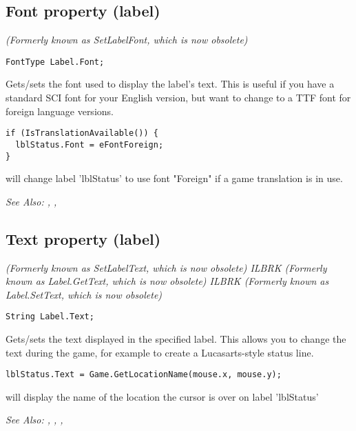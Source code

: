 \subsection{Font property (label)}\label{Label.Font}%

\it{(Formerly known as SetLabelFont, which is now obsolete)}

\begin{verbatim}
FontType Label.Font;
\end{verbatim}
Gets/sets the font used to display the label's text. This is useful if you
have a standard SCI font for your English version, but want to change to
a TTF font for foreign language versions.

\begin{verbatim}
if (IsTranslationAvailable()) {
  lblStatus.Font = eFontForeign;
}
\end{verbatim}

will change label 'lblStatus' to use font "Foreign" if a game translation is in use.

\it{See Also:} ,
, 


\subsection{Text property (label)}\label{Label.Text}%

\it{(Formerly known as SetLabelText, which is now obsolete)} ILBRK
\it{(Formerly known as Label.GetText, which is now obsolete)} ILBRK
\it{(Formerly known as Label.SetText, which is now obsolete)}

\begin{verbatim}
String Label.Text;
\end{verbatim}
Gets/sets the text displayed in the specified label.  This allows you to change
the text during the game, for example to create a Lucasarts-style status line.

\begin{verbatim}
lblStatus.Text = Game.GetLocationName(mouse.x, mouse.y);
\end{verbatim}
will display the name of the location the cursor is over on label 'lblStatus'

\it{See Also:} ,
,
, 


